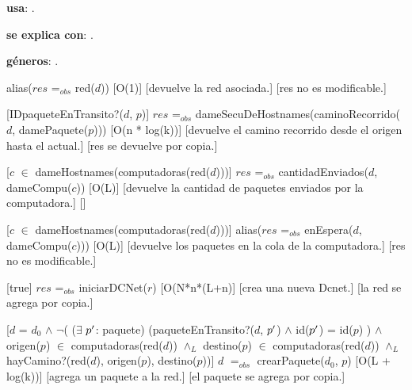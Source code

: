 \begin{Interfaz}

  \textbf{usa}: .
  
  \textbf{se explica con}: .

  \textbf{g\'eneros}: .


  {alias($res$ =$_{obs}$ red($d$))}%
  [O(1)]
  [devuelve la red asociada.]
  [res no es modificable.]

  [IDpaqueteEnTransito?($d$, $p$)]
  {$res$ =$_{obs}$ dameSecuDeHostnames(caminoRecorrido($d$, damePaquete($p$)))}%
  [O(n * log(k))]
  [devuelve el camino recorrido desde el origen hasta el actual.]
  [res se devuelve por copia.]
  
  [$c$ $\in$ dameHostnames(computadoras(red($d$)))]
  {$res$ =$_{obs}$ cantidadEnviados($d$, dameCompu($c$))}%
  [O(L)]
  [devuelve la cantidad de paquetes enviados por la computadora.]
  []

  [$c$ $\in$ dameHostnames(computadoras(red($d$)))]
  {alias($res$ =$_{obs}$ enEspera($d$, dameCompu($c$)))}%
  [O(L)]
  [devuelve los paquetes en la cola de la computadora.]
  [res no es modificable.]
  
  [true]
  {$res$ =$_{obs}$ iniciarDCNet($r$)}%
  [O(N*n*(L+n)]
  [crea una nueva Dcnet.]
  [la red se agrega por copia.]
    
  [$d$ = $d_0$ $\wedge$ $\neg$( ($\exists$ $p\sp{\prime}$: paquete) (paqueteEnTransito?($d$, $p\sp{\prime}$) $\wedge$ id($p\sp{\prime}$) = id($p$) ) $\wedge$ \newline
  origen($p$) $\in$ computadoras(red($d$)) $\wedge_L$ destino($p$) $\in$ computadoras(red($d$)) $\wedge_L$ hayCamino?(red($d$), origen($p$), destino($p$))]
  {$d$ $=_{obs}$ crearPaquete($d_0$, $p$)}%
  [O(L + log(k))]
  [agrega un paquete a la red.]
  [el paquete se agrega por copia.]

\newpage


\end{Interfaz}
